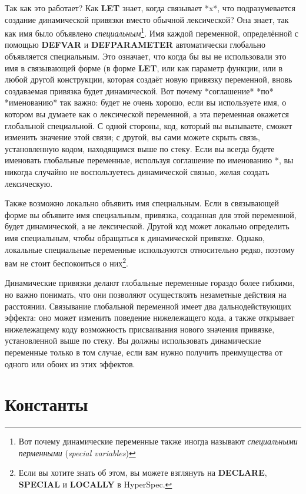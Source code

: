 Так как это работает? Как \textbf{LET} знает, когда связывает *x*, что подразумевается
создание динамической привязки вместо обычной лексической? Она знает, так как имя было
объявлено \textit{специальным}\footnote{Вот почему динамические переменные также иногда
  называют \textit{специальными перменными} (\textit{special variables}) }. Имя каждой
переменной, определённой с помощью \textbf{DEFVAR} и \textbf{DEFPARAMETER} автоматически
глобально объявляется специальным. Это означает, что когда бы вы не использовали это имя в
связывающей форме (в форме \textbf{LET}, или как параметр функции, или в любой другой
конструкции, которая создаёт новую привязку переменной, вновь создаваемая привязка будет
динамической. Вот почему *соглашение* *по* *именованию* так важно: будет не очень хорошо,
если вы используете имя, о котором вы думаете как о лексической переменной, а эта
переменная окажется глобальной специальной. С одной стороны, код, который вы вызываете,
сможет изменить значение этой связи; с другой, вы сами можете скрыть связь, установленную
кодом, находящимся выше по стеку. Если вы всегда будете именовать глобальные переменные,
используя соглашение по именованию *, вы никогда случайно не воспользуетесь динамической
связью, желая создать лексическую.

Также возможно локально объявить имя специальным. Если в связывающей форме вы объявите имя
специальным, привязка, созданная для этой переменной, будет динамической, а не
лексической. Другой код может локально определить имя специальным, чтобы обращаться к
динамической привязке. Однако, локальные специальные переменные используются относительно
редко, поэтому вам не стоит беспокоиться о них\footnote{Если вы хотите знать об этом, вы
  можете взглянуть на \textbf{DECLARE}, \textbf{SPECIAL} и \textbf{LOCALLY} в HyperSpec.}.

Динамические привязки делают глобальные переменные гораздо более гибкими, но важно понимать,
что они позволяют осуществлять незаметные действия на расстоянии. Связывание глобальной
переменной имеет два дальнодействующих эффекта: оно может изменить поведение нижележащего кода,
а также открывает нижележащему коду возможность присваивания нового значения привязке,
установленной выше по стеку. Вы должны использовать динамические переменные только в том
случае, если вам нужно получить преимущества от одного или обоих из этих эффектов.

\section{Константы}

